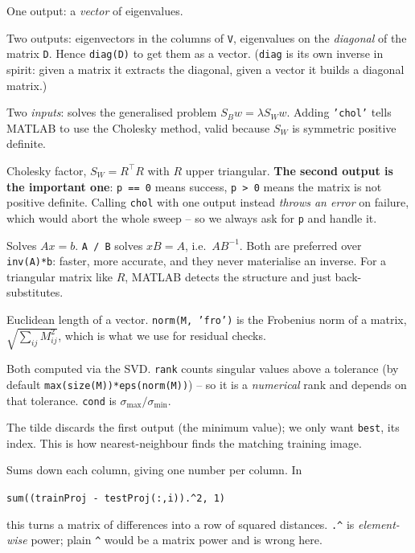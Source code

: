 \documentclass[11pt]{article}
\theoremstyle{definition}
\theoremstyle{remark}
\newcommand{\Sw}{S_W}
\newcommand{\Sb}{S_B}
\begin{document}
\begin{description}[leftmargin=*,style=nextline]
\item[\texttt{e = eig(L)}] One output: a \emph{vector} of eigenvalues.
\item[\texttt{[V, D] = eig(L)}] Two outputs: eigenvectors in the columns of
  \texttt{V}, eigenvalues on the \emph{diagonal} of the matrix \texttt{D}. Hence
  \texttt{diag(D)} to get them as a vector. (\texttt{diag} is its own inverse in
  spirit: given a matrix it extracts the diagonal, given a vector it builds a
  diagonal matrix.)
\item[\texttt{eig(Sb, Sw)}] Two \emph{inputs}: solves the generalised problem
  $\Sb w=\lambda\Sw w$. Adding \texttt{'chol'} tells MATLAB to use the Cholesky
  method, valid because $\Sw$ is symmetric positive definite.
\item[\texttt{[R, p] = chol(Sw)}] Cholesky factor, $\Sw = R^{\!\top} R$ with $R$ upper
  triangular. \textbf{The second output is the important one}: \texttt{p == 0} means
  success, \texttt{p > 0} means the matrix is not positive definite. Calling
  \texttt{chol} with one output instead \emph{throws an error} on failure, which
  would abort the whole sweep -- so we always ask for \texttt{p} and handle it.
\item[\texttt{A \textbackslash\ b}] Solves $Ax=b$. \texttt{A / B} solves $xB=A$,
  i.e.\ $AB^{-1}$. Both are preferred over \texttt{inv(A)*b}: faster, more
  accurate, and they never materialise an inverse. For a triangular matrix like
  $R$, MATLAB detects the structure and just back-substitutes.
\item[\texttt{norm(v)}] Euclidean length of a vector.
  \texttt{norm(M, 'fro')} is the Frobenius norm of a matrix, $\sqrt{\sum_{ij}M_{ij}^2}$,
  which is what we use for residual checks.
\item[\texttt{rank(M)}, \texttt{cond(M)}] Both computed via the SVD. \texttt{rank}
  counts singular values above a tolerance (by default
  \texttt{max(size(M))*eps(norm(M))}) -- so it is a \emph{numerical} rank and
  depends on that tolerance. \texttt{cond} is $\sigma_{\max}/\sigma_{\min}$.
\item[\texttt{[\textasciitilde, best] = min(d)}] The tilde discards the first
  output (the minimum value); we only want \texttt{best}, its index. This is how
  nearest-neighbour finds the matching training image.
\item[\texttt{sum(M, 1)}] Sums down each column, giving one number per column.
  In
  \begin{center}\texttt{sum((trainProj - testProj(:,i)).\^{}2, 1)}\end{center}
  this turns a matrix of differences into a row of squared distances.
  \texttt{.\^{}} is \emph{element-wise} power; plain \texttt{\^{}} would be a
  matrix power and is wrong here.
\end{description}
\end{document}
